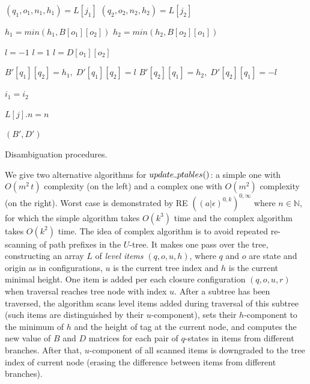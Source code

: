 \documentclass[AMA,STIX1COL]{WileyNJD-v2}
\newcommand{\Xund}{\rule{.4em}{.4pt}}
\newcommand{\YN}{\mathbb{N}}
\begin{document}
\begin{algorithm}[H]
\begin{multicols}{2}
{{{{                    \BlankLine
                     {
                        $(q_1, o_1, n_1, h_1) = L[j_1]$ \;
                        $(q_2, o_2, n_2, h_2) = L[j_2]$ \;

                        \BlankLine
                         {
                            $h_1 = min(h_1, B[o_1][o_2])$ \;
                            $h_2 = min(h_2, B[o_2][o_1])$ \;
                        }

                        \BlankLine
                            {$l = -1$}
                            {$l = 1$ }
                         {$l = D[o_1][o_2]$}
                    }

                    \BlankLine
                    $B'[q_1][q_2] = h_1, \; D'[q_1][q_2] = l$ \;
                    $B'[q_2][q_1] = h_2, \; D'[q_2][q_1] = -l$ \;
                }

                $i_1 = i_2$ \;
            }

            \BlankLine
             {
                $L[j].n = n$
            }
        }

        \BlankLine
        \Return $(B', D')$ \;
    }

\end{multicols}
\caption{Disambiguation procedures.}
\end{algorithm}
\medskip

We give two alternative algorithms for $update \Xund ptables ()$:
a simple one with $O(m^2 \, t)$ complexity (on the left) and a complex one with $O(m^2)$ complexity (on the right).
Worst case is demonstrated by RE $((a|\epsilon)^{0,k})^{0,\infty}$ where $n \in \YN$,
for which the simple algorithm takes $O(k^3)$ time and the complex algorithm takes $O(k^2)$ time.
%
The idea of complex algorithm is to avoid repeated re-scanning of path prefixes in the $U$-tree.
It makes one pass over the tree,
constructing an array $L$ of \emph{level items} $(q, o, u, h)$, where
$q$ and $o$ are state and origin as in configurations,
$u$ is the current tree index and $h$ is the current minimal height.
One item is added per each closure configuration $(q, o, u, r)$ when traversal reaches tree node with index $u$.
After a subtree has been traversed,
the algorithm scans level items added during traversal of this subtree (such items are distinguished by their $u$-component),
sets their $h$-component to the minimum of $h$ and the height of tag at the current node,
and computes the new value of $B$ and $D$ matrices for each pair of $q$-states in items from different branches.
After that, $u$-component of all scanned items is downgraded to the tree index of current node
(erasing the difference between items from different branches).
\end{document}
